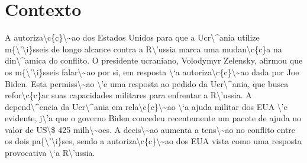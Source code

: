 \documentclass{article}%
\begin{document}
\section{Contexto}%
\label{sec:Contexto}%
A autoriza\textbackslash{}c\{c\}\textbackslash{}\textasciitilde{}ao dos Estados Unidos para que a Ucr\textbackslash{}\^{}ania utilize m\{\textbackslash{}'\textbackslash{}i\}sseis de longo alcance contra a R\textbackslash{}'ussia marca uma mudan\textbackslash{}c\{c\}a na din\textbackslash{}\^{}amica do conflito. O presidente ucraniano, Volodymyr Zelensky, afirmou que os m\{\textbackslash{}'\textbackslash{}i\}sseis falar\textbackslash{}\textasciitilde{}ao por si, em resposta \textbackslash{}`a autoriza\textbackslash{}c\{c\}\textbackslash{}\textasciitilde{}ao dada por Joe Biden. Esta permiss\textbackslash{}\textasciitilde{}ao \textbackslash{}'e uma resposta ao pedido da Ucr\textbackslash{}\^{}ania, que busca refor\textbackslash{}c\{c\}ar suas capacidades militares para enfrentar a R\textbackslash{}'ussia. A depend\textbackslash{}\^{}encia da Ucr\textbackslash{}\^{}ania em rela\textbackslash{}c\{c\}\textbackslash{}\textasciitilde{}ao \textbackslash{}`a ajuda militar dos EUA \textbackslash{}'e evidente, j\textbackslash{}'a que o governo Biden concedeu recentemente um pacote de ajuda no valor de US\textbackslash{}\$ 425 milh\textbackslash{}\textasciitilde{}oes. A decis\textbackslash{}\textasciitilde{}ao aumenta a tens\textbackslash{}\textasciitilde{}ao no conflito entre os dois pa\{\textbackslash{}'\textbackslash{}i\}ses, sendo a autoriza\textbackslash{}c\{c\}\textbackslash{}\textasciitilde{}ao dos EUA vista como uma resposta provocativa \textbackslash{}`a R\textbackslash{}'ussia.

%
\end{document}
